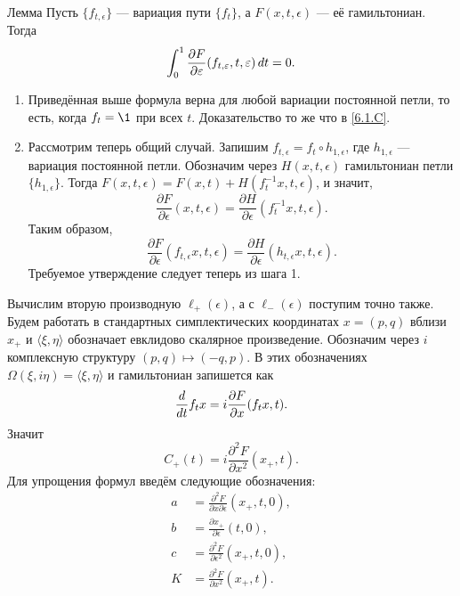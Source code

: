 \begin{thm}{Лемма}\label{12.4.B}
Пусть $\{f_{t,\epsilon}\}$ — вариация пути $\{f_t\}$, а $F(x, t,\epsilon)$ — её гамильтониан.
Тогда 
\[\int_0^1\frac{\partial F}{\partial \varepsilon}(f_{t,\varepsilon},t,\varepsilon)\,d t=0.\] 

\end{thm}

\begin{enumerate}[1)]
\item Приведённая выше формула верна для любой вариации постоянной петли, то есть, когда $f_t = \1$ при всех $t$.
Доказательство то же что в \ref{6.1.C}.
\item Рассмотрим теперь общий случай.
Запишим $f_{t,\epsilon} = f_t \circ h_{1,\epsilon}$, где $h_{1,\epsilon}$ — вариация постоянной петли.
Обозначим через $H(x, t, \epsilon)$ гамильтониан петли $\{h_{1,\epsilon}\}$.
Тогда $F(x,t,\epsilon) = F(x,t) + H(f_t^{-1}x,t,\epsilon)$, и значит, 
\[\frac{\partial F}{\partial \epsilon}(x,t,\epsilon)=\frac{\partial H}{\partial \epsilon}(f_t^{-1}x,t,\epsilon).\]
Таким образом,
\[\frac{\partial F}{\partial \epsilon}(f_{t,\epsilon}x,t,\epsilon)=\frac{\partial H}{\partial \epsilon}(h_{t,\epsilon}x,t,\epsilon).\]
Требуемое утверждение следует теперь из шага 1.
\qeds
\end{enumerate}


Вычислим вторую производную $\ell_+(\epsilon)$,
а с $\ell_-(\epsilon)$ поступим точно также.
Будем работать в стандартных симплектических координатах $x = (p, q)$ вблизи $x_+$ и $\langle\xi,\eta\rangle$ обозначает евклидово скалярное произведение.
Обозначим через $i$ комплексную структуру $(p, q) \mapsto (-q, p)$.
В этих обозначениях $\Omega(\xi, i\eta) = \langle\xi,\eta\rangle$ и гамильтониан запишется как
\[\frac{d}{d t}f_tx=i\frac{\partial F}{\partial x}(f_tx,t).\]
Значит
\[C_+(t)=i\frac{\partial^2F}{\partial x^2}(x_+,t).\]
Для упрощения формул введём следующие обозначения: 
\begin{align*}
a&=\frac{\partial^2 F}{\partial x\partial\epsilon}(x_+,t,0),
\\
b&=\frac{\partial x_+}{\partial\epsilon}(t,0),
\\
c&=\frac{\partial^2 F}{\partial\epsilon^2}(x_+,t,0),
\\
K&=\frac{\partial^2 F}{\partial x^2}(x_+,t).
\end{align*}

